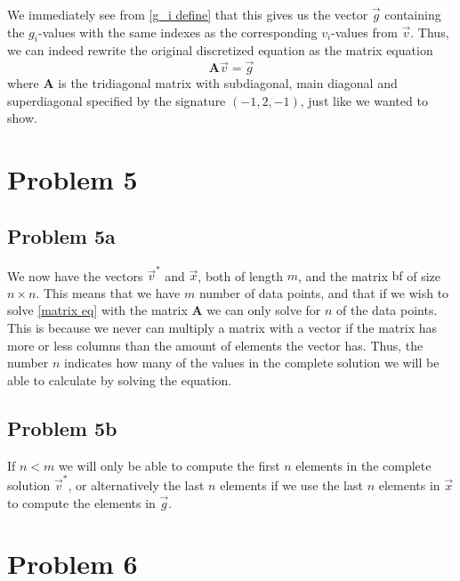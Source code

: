 \documentclass[english,notitlepage]{revtex4-1}  %
\begin{document}
We immediately see from \eqref{g_i define} that this gives us the vector $\vec{g}$ containing the $g_i$-values with the same indexes as the corresponding $v_i$-values from $\vec{v}$. Thus, we can indeed rewrite the original discretized equation as the matrix equation
\begin{equation}
    \textbf{A}\vec{v} = \vec{g} \label{matrix eq}
\end{equation}
where $\textbf{A}$ is the tridiagonal matrix with subdiagonal, main diagonal and superdiagonal specified by the signature $(-1, 2, -1)$, just like we wanted to show.


\section*{Problem 5}
\subsection*{Problem 5a}
We now have the vectors $\vec{v}^*$ and $\vec{x}$, both of length $m$, and the matrix $\text{bf}$ of size $n \times n$. This means that we have $m$ number of data points, and that if we wish to solve \eqref{matrix eq} with the matrix $\textbf{A}$ we can only solve for $n$ of the data points. This is because we never can multiply a matrix with a vector if the matrix has more or less columns than the amount of elements the vector has. Thus, the number $n$ indicates how many of the values in the complete solution we will be able to calculate by solving the equation.

\subsection*{Problem 5b}
If $n < m$ we will only be able to compute the first $n$ elements in the complete solution $\vec{v}^*$, or alternatively the last $n$ elements if we use the last $n$ elements in $\vec{x}$ to compute the elements in $\vec{g}$.


\section*{Problem 6}
\end{document}
